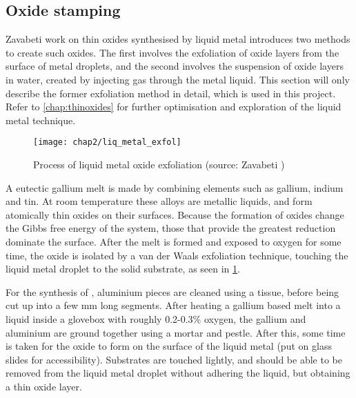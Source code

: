 \documentclass[../../Matt_Gebert_Honours_Thesis.tex]{subfiles}
\begin{document}
	\subsection{Oxide stamping}
	Zavabeti \etals\cite{zavabeti_liquid_2017} work on thin oxides synthesised by liquid metal introduces two methods to create such oxides. The first involves the exfoliation of oxide layers from the surface of metal droplets, and the second involves the suspension of oxide layers in water, created by injecting gas through the metal liquid. This section will only describe the former exfoliation method in detail, which is used in this project. Refer to \cref{chap:thinoxides} for further optimisation and exploration of the liquid metal technique.
	
	\begin{figure}[H]
		\texttt{[image: chap2/liq\_metal\_exfol]}
		\caption[Liquid metal oxide exfoliation]{Process of liquid metal oxide exfoliation (source: Zavabeti \etal{}\cite{zavabeti_liquid_2017})}\label{fig:liq_metal_exfoliation}
	\end{figure}	
	
	A eutectic gallium melt is made by combining elements such as gallium, indium and tin. At room temperature these alloys are metallic liquids, and form atomically thin oxides on their surfaces. Because the formation of oxides change the Gibbs free energy of the system, those that provide the greatest reduction dominate the surface\cite{zavabeti_liquid_2017}. After the melt is formed and exposed to oxygen for some time, the oxide is isolated by a van der Waals exfoliation technique, touching the liquid metal droplet to the solid substrate, as seen in \cref{fig:liq_metal_exfoliation}.
	
	For the synthesis of \aluminimumoxide{}, aluminium pieces are cleaned using a tissue, before being cut up into a few mm long segments. After heating a gallium based melt into a liquid inside a glovebox with roughly 0.2-0.3\% oxygen, the gallium and aluminium are ground together using a mortar and pestle. After this, some time is taken for the oxide to form on the surface of the liquid metal (put on glass slides for accessibility). Substrates are touched lightly, and should be able to be removed from the liquid metal droplet without adhering the liquid, but obtaining a thin oxide layer.
	
\end{document}
